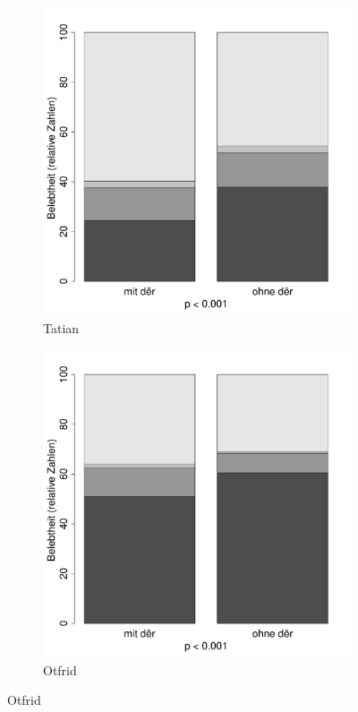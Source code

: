 \begin{figure}
\begin{subfigure}[b]{.5\linewidth}
  \includegraphics[height=.25\textheight]{generated/images/belebtheit-T}
\caption {Tatian}
\end{subfigure}%
\begin{subfigure}[b]{.5\linewidth}
  \includegraphics[height=.25\textheight]{generated/images/belebtheit-O}
\caption {Otfrid}
\end{subfigure}


\end{figure}
